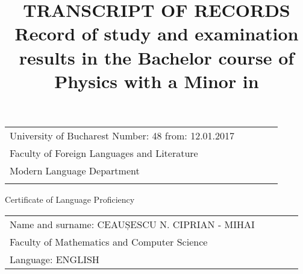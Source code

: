 \documentclass[a4paper,9pt,final]{scrartcl}
\title{\textbf{TRANSCRIPT OF RECORDS}\\[0.5em]
Record of study and examination results in the
Bachelor course of Physics
with a Minor in \ergfach}
\author{}
\begin{document}

\begin{tabular}{llcll} 
	University of Bucharest \hspace{25em} Number: 48 from: 12.01.2017\\
	Faculty of Foreign Languages and Literature \\
	Modern Language Department\\
\vspace{2em}
\end{tabular}
\begin{center}
	\begin{Huge}Certificate of Language Proficiency\end{Huge} 
\vspace{2em}
\end{center}
\begin{tabular}{llcll} 
	Name and surname: CEAUȘESCU N. CIPRIAN - MIHAI \\
	Faculty of Mathematics and Computer Science \\
	Language: ENGLISH
\vspace{2em}
\end{tabular}
\end{document}
